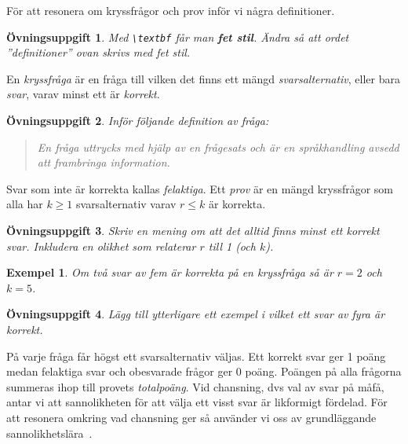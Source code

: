 \documentclass[12pt,a4wide]{article}
\newtheorem{exempel}{Exempel} %
\theoremstyle{uppgiftsstil}
\newcommand{\ovningstext}{Övningsuppgift}
\newtheorem{ovning}{\ovningstext}
\newenvironment{uppgift}{\begin{framed}\begin{ovning}}%
                        {\end{ovning}\end{framed}}
\theoremstyle{avklaradstil}
\begin{document}
För att resonera om kryssfrågor och prov inför vi några definitioner. 
\begin{uppgift}
  Med \verb|\textbf| får man \textbf{fet stil}. Ändra så att ordet
  ''definitioner'' ovan skrivs med fet stil. 
\end{uppgift}
En \emph{kryssfråga}         %
är en fråga till vilken det finns ett mängd \emph{svarsalternativ},
eller bara \emph{svar}, varav minst ett är \emph{korrekt}. 
\begin{uppgift}
  Inför följande definition av \emph{fråga}: 
  \begin{quote}
    En fråga uttrycks med hjälp av en frågesats och är en
    språkhandling avsedd att frambringa information. 
  \end{quote}
\end{uppgift}
Svar som inte är korrekta kallas \emph{felaktiga}. Ett \emph{prov} är
en mängd kryssfrågor som alla har 
$k\geq 1$        %
svarsalternativ varav 
$r\leq k$          %
är korrekta.
\begin{uppgift}
  Skriv en mening om att det alltid finns minst ett korrekt
  svar. Inkludera en olikhet som relaterar $r$ till 1 (och $k$). 
\end{uppgift}
%
%
%
%
%
\begin{exempel}    %
  Om två svar av fem är korrekta på en kryssfråga så är $r=2$ och
  $k=5$.
\end{exempel}       %
\begin{uppgift} \label{exuppgift}
  Lägg till ytterligare ett exempel i vilket ett svar av fyra är
  korrekt. 
\end{uppgift}
%
%
%
%
På varje fråga får högst ett svarsalternativ väljas. Ett korrekt svar
ger 1 poäng medan felaktiga svar och obesvarade frågor ger 0
poäng. Poängen på alla frågorna summeras ihop till provets
\emph{totalpoäng}. Vid chansning, dvs val av svar på måfå, antar vi
att sannolikheten för att välja ett visst svar är likformigt
fördelad. För att resonera omkring vad chansning ger så använder vi
oss av grundläggande sannolikhetslära~\cite{grimaldi}.  
\end{document}
